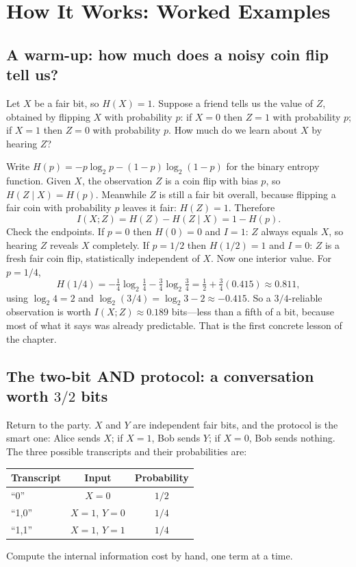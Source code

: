 \section{How It Works: Worked Examples}

\subsection{A warm-up: how much does a noisy coin flip tell us?}
Let $X$ be a fair bit, so $H(X)=1$. Suppose a friend tells us the value of $Z$, obtained by flipping $X$ with probability $p$: if $X=0$ then $Z=1$ with probability $p$; if $X=1$ then $Z=0$ with probability $p$. How much do we learn about $X$ by hearing $Z$?

Write $H(p)=-p\log_2 p-(1-p)\log_2(1-p)$ for the binary entropy function. Given $X$, the observation $Z$ is a coin flip with bias $p$, so $H(Z\mid X)=H(p)$. Meanwhile $Z$ is still a fair bit overall, because flipping a fair coin with probability $p$ leaves it fair: $H(Z)=1$. Therefore
\[
I(X;Z)=H(Z)-H(Z\mid X)=1-H(p).
\]
Check the endpoints. If $p=0$ then $H(0)=0$ and $I=1$: $Z$ always equals $X$, so hearing $Z$ reveals $X$ completely. If $p=1/2$ then $H(1/2)=1$ and $I=0$: $Z$ is a fresh fair coin flip, statistically independent of $X$. Now one interior value. For $p=1/4$,
\[
H(1/4)=-\tfrac14\log_2\tfrac14-\tfrac34\log_2\tfrac34=\tfrac12+\tfrac34(0.415)\approx 0.811,
\]
using $\log_2 4=2$ and $\log_2(3/4)=\log_2 3-2\approx -0.415$. So a $3/4$-reliable observation is worth $I(X;Z)\approx0.189$ bits---less than a fifth of a bit, because most of what it says was already predictable. That is the first concrete lesson of the chapter.

\subsection{The two-bit AND protocol: a conversation worth $3/2$ bits}
Return to the party. $X$ and $Y$ are independent fair bits, and the protocol is the smart one: Alice sends $X$; if $X=1$, Bob sends $Y$; if $X=0$, Bob sends nothing. The three possible transcripts and their probabilities are:
\begin{center}
\begin{tabular}{lcc}
\toprule
Transcript & Input & Probability \\
\midrule
``0'' & $X=0$ & $1/2$ \\
``1,0'' & $X=1$, $Y=0$ & $1/4$ \\
``1,1'' & $X=1$, $Y=1$ & $1/4$ \\
\bottomrule
\end{tabular}
\end{center}
Compute the internal information cost by hand, one term at a time.

